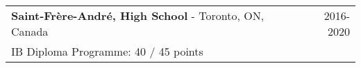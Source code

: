 \begin{tabularx}{\textwidth}{ @{}X r@{} }
    \textbf{Saint-Frère-André, High School} - Toronto, ON, Canada & 2016-2020 \\
    IB Diploma Programme: 40 / 45 points
\end{tabularx} 